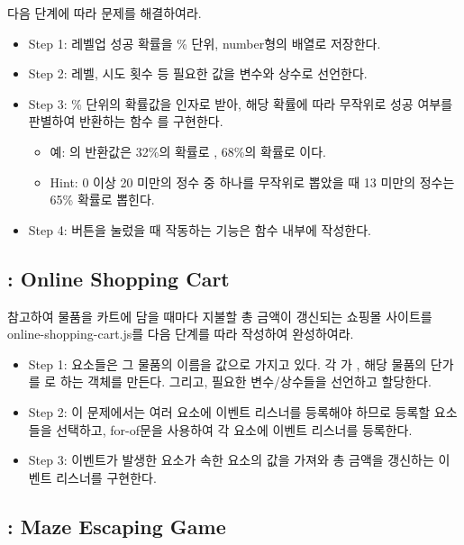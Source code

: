 다음 단계에 따라 문제를 해결하여라.

\begin{itemize}
    \item Step 1: 레벨업 성공 확률을 \% 단위, number형의 배열로 저장한다.
    \item Step 2: 레벨, 시도 횟수 등 필요한 값을 변수와 상수로 선언한다.
    \item Step 3: \% 단위의 확률값을 인자로 받아, 해당 확률에 따라 무작위로 성공 여부를 판별하여 반환하는 함수 를 구현한다.
    \begin{itemize}
        \item 예: 의 반환값은 32\%의 확률로 , 68\%의 확률로 이다.
        \item Hint: 0 이상 20 미만의 정수 중 하나를 무작위로 뽑았을 때 13 미만의 정수는 65\% 확률로 뽑힌다.
    \end{itemize}
    \item Step 4: 버튼을 눌렀을 때 작동하는 기능은  함수 내부에 작성한다.
\end{itemize}

\subsection*{: Online Shopping Cart}

\을 참고하여 물품을 카트에 담을 때마다 지불할 총 금액이 갱신되는 쇼핑몰 사이트를 online-shopping-cart.js를 다음 단계를 따라 작성하여 완성하여라.

\begin{itemize}
    \item Step 1:  요소들은 그 물품의 이름을  값으로 가지고 있다. 각 가 , 해당 물품의 단가를 로 하는 객체를 만든다. 그리고, 필요한 변수/상수들을 선언하고 할당한다.
    \item Step 2: 이 문제에서는 여러 요소에 이벤트 리스너를 등록해야 하므로 등록할 요소들을 선택하고, for-of문을 사용하여 각 요소에 이벤트 리스너를 등록한다.
    \item Step 3: 이벤트가 발생한 요소가 속한  요소의  값을 가져와 총 금액을 갱신하는 이벤트 리스너를 구현한다.
\end{itemize}

\subsection*{: Maze Escaping Game}

